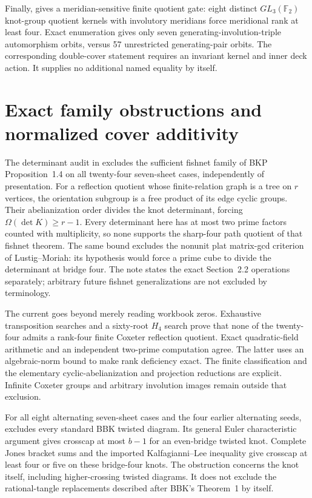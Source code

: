 \documentclass[11pt]{article}
\begin{document}
{Finally,  gives a
meridian-sensitive finite quotient gate: eight distinct
$GL_3(\mathbb F_2)$ knot-group quotient kernels with involutory
meridians force meridional rank at least four. Exact enumeration gives
only seven generating-involution-triple automorphism orbits, versus
57 unrestricted generating-pair orbits. The corresponding
double-cover statement requires an invariant kernel and inner deck
action. It supplies no additional named equality by itself.


\section{Exact family obstructions and normalized cover additivity}

The determinant audit in  excludes the
sufficient fishnet family of BKP Proposition~1.4 on all twenty-four
seven-sheet cases, independently of presentation. For a reflection
quotient whose finite-relation graph is a tree on $r$ vertices, the
orientation subgroup is a free product of its edge cyclic groups.
Their abelianization order divides the knot determinant, forcing
$\Omega(\det K)\ge r-1$. Every determinant here has at most two prime
factors counted with multiplicity, so none supports the sharp-four
path quotient of that fishnet theorem. The same bound excludes the
nonunit plat matrix-gcd criterion of Lustig--Moriah: its hypothesis
would force a prime cube to divide the determinant at bridge four.
The note states the exact Section~2.2 operations separately; arbitrary
future fishnet generalizations are not excluded by terminology.

The current  goes beyond merely
reading workbook zeros. Exhaustive transposition searches and a
sixty-root $H_4$ search prove that none of the twenty-four admits a
rank-four finite Coxeter reflection quotient. Exact quadratic-field
arithmetic and an independent two-prime computation agree. The
latter uses an algebraic-norm bound to make rank deficiency exact.
The finite classification and the elementary cyclic-abelianization
and projection reductions are explicit. Infinite Coxeter groups and
arbitrary involution images remain outside that exclusion.

For all eight alternating seven-sheet cases and the four earlier
alternating seeds, 
excludes every standard BBK twisted diagram. Its general Euler
characteristic argument gives crosscap at most $b-1$ for an
even-bridge twisted knot. Complete Jones bracket sums and the
imported Kalfagianni--Lee inequality give crosscap at least four
or five on these bridge-four knots. The obstruction concerns the
knot itself, including higher-crossing twisted diagrams. It does not
exclude the rational-tangle replacements described after BBK's
Theorem~1 by itself.

}
\end{document}
